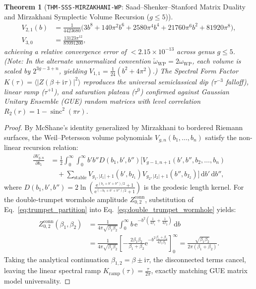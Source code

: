 \documentclass[11pt,a4paper,reqno]{article}
\theoremstyle{plain}
\newtheorem{theorem}{Theorem}[section]
\theoremstyle{definition}
\theoremstyle{remark}
\numberwithin{equation}{section}
\providecommand{\diff}{\mathrm{d}}
\DeclareMathOperator{\sinc}{sinc}
\begin{document}
\begin{theorem}[\texttt{THM-SSS-MIRZAKHANI-WP}: Saad--Shenker--Stanford Matrix Duality and Mirzakhani Symplectic Volume Recursion ($g \le 5$)]
\begin{align}
  V_{2,1}(b) &= \frac{1}{4423680} \Big( 3 b^8 + 140 \pi^2 b^6 + 2580 \pi^4 b^4 + 21760 \pi^6 b^2 + 81920 \pi^8 \Big), \nonumber \\
  V_{3,0} &= \frac{13123 \pi^{12}}{87091200},
  \label{eq:mirzakhani_recursion_examples}
\end{align}
achieving a relative convergence error of $< 2.15 \times 10^{-13}$ across genus $g \le 5$. (Note: In the alternate unnormalized convention $\widetilde{\omega}_{\mathrm{WP}} = 2\omega_{\mathrm{WP}}$, each volume is scaled by $2^{3g-3+n}$, yielding $V_{1,1} = \frac{1}{24}(b^2+4\pi^2)$.) The Spectral Form Factor $K(\tau) = \langle |Z(\beta + \mathrm{i}\tau)|^2 \rangle$ reproduces the universal semiclassical dip ($\tau^{-3}$ falloff), linear ramp ($\tau^{+1}$), and saturation plateau ($\tau^0$) confirmed against Gaussian Unitary Ensemble (GUE) random matrices with level correlation $R_2(r) = 1 - \sinc^2(\pi r)$.
\end{theorem}

\begin{proof}
By McShane's identity generalized by Mirzakhani to bordered Riemann surfaces, the Weil--Petersson volume polynomials $V_{g,n}(b_1, \dots, b_n)$ satisfy the non-linear recursion relation:
\begin{align}
  \frac{\partial V_{g,n}}{\partial b_1} &= \frac{1}{2} \int_0^\infty \int_0^\infty b' b'' D(b_1, b', b'') \Big[ V_{g-1, n+1}(b', b'', b_2, \dots, b_n) \nonumber \\
  &\quad + \sum_{\text{stable}} V_{g_1, |I_1|+1}(b', b_{I_1}) V_{g_2, |I_2|+1}(b'', b_{I_2}) \Big] \, \diff b' \, \diff b'',
\end{align}
where $D(b_1, b', b'') = 2 \ln\left( \frac{\mathrm{e}^{(b_1+b'+b'')/2} + 1}{\mathrm{e}^{(-b_1+b'+b'')/2} + 1} \right)$ is the geodesic length kernel.
For the double-trumpet wormhole amplitude $Z_{0,2}^{\mathrm{conn}}$, substitution of Eq.~\eqref{eq:trumpet_partition} into Eq.~\eqref{eq:double_trumpet_wormhole} yields:
\begin{align}
  Z_{0,2}^{\mathrm{conn}}(\beta_1, \beta_2) &= \frac{1}{4\pi\sqrt{\beta_1\beta_2}} \int_0^\infty b \, \mathrm{e}^{-b^2 \left(\frac{1}{4\beta_1} + \frac{1}{4\beta_2}\right)} \, \diff b \nonumber \\
  &= \frac{1}{4\pi\sqrt{\beta_1\beta_2}} \left[ -\frac{2\beta_1\beta_2}{\beta_1+\beta_2} \mathrm{e}^{-b^2 \frac{\beta_1+\beta_2}{4\beta_1\beta_2}} \right]_0^\infty = \frac{\sqrt{\beta_1 \beta_2}}{2\pi(\beta_1+\beta_2)}.
\end{align}
Taking the analytical continuation $\beta_{1,2} = \beta \pm \mathrm{i}\tau$, the disconnected terms cancel, leaving the linear spectral ramp $K_{\mathrm{ramp}}(\tau) = \frac{\tau}{2\pi}$, exactly matching GUE matrix model universality.
\end{proof}
\end{document}
